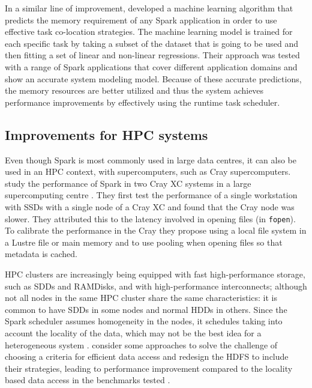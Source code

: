 \documentclass{article}
\begin{document}
In a similar line of improvement, \citeauthor{Marco2017} \cite{Marco2017} developed a machine learning algorithm that predicts the memory requirement of any Spark application in order to use effective task co-location strategies. The machine learning model is trained for each specific task by taking a subset of the dataset that is going to be used and then fitting a set of linear and non-linear regressions. Their approach was tested with a range of Spark applications that cover different application domains and show an accurate system modeling model. Because of these accurate predictions, the memory resources are better utilized and thus the system achieves performance improvements by effectively using the runtime task scheduler.

\subsection{Improvements for HPC systems}

Even though Spark is most commonly used in large data centres, it can also be used in an HPC context, with supercomputers, such as Cray supercomputers. \citeauthor{Chaimov2016} study the performance of Spark in two Cray XC systems in a large supercomputing centre \cite{Chaimov2016}. They first test the performance of a single workstation with SSDs with a single node of a Cray XC and found that the Cray node was slower. They attributed this to the latency involved in opening files (in \texttt{fopen}). To calibrate the performance in the Cray they propose using a local file system in a Lustre file or main memory and to use pooling when opening files so that metadata is cached.

HPC clusters are increasingly being equipped with fast high-performance storage, such as SDDs and RAMDisks, and with high-performance interconnects; although not all nodes in the same HPC cluster share the same characteristics: it is common to have SDDs in some nodes and normal HDDs in others. Since the Spark scheduler assumes homogeneity in the nodes, it schedules taking into account the locality of the data, which may not be the best idea for a heterogeneous system \cite{Islam2016}. \citeauthor{Islam2016} consider some approaches to solve the challenge of choosing a criteria for efficient data access and redesign the HDFS to include their strategies, leading to performance improvement compared to the locality based data access in the benchmarks tested \cite{Islam2016}.
\end{document}
